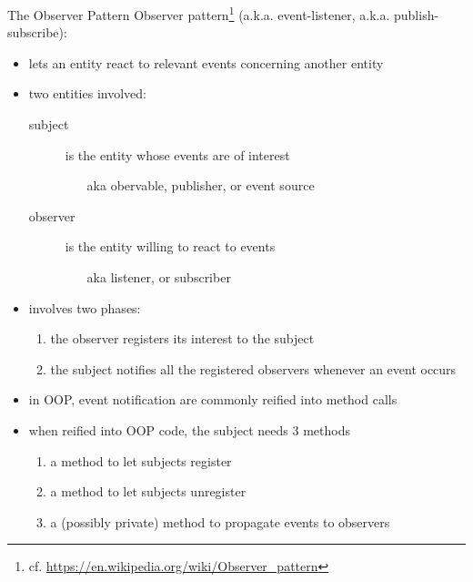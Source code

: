 \documentclass[presentation]{beamer}
\begin{document}
\begin{frame}[allowframebreaks]{The Observer Pattern}
  Observer pattern\footnote{cf. \url{https://en.wikipedia.org/wiki/Observer_pattern}} (a.k.a. event-listener, a.k.a. publish-subscribe):
  \begin{itemize}
    \item lets an entity \alert{react} to relevant events concerning another entity

    \item two entities involved: 
    \begin{description}
      \item[subject] is the entity whose events are of interest
      \begin{itemize}
        \item[aka] obervable,  publisher, or event source
      \end{itemize} 

      \item[observer] is the entity willing to react to events
      \begin{itemize}
        \item[aka] listener, or subscriber
      \end{itemize} 
    \end{description}

    \item involves two phases:
    \begin{enumerate}
      \item the observer registers its interest to the subject
      \item the subject notifies all the registered observers whenever an event occurs
    \end{enumerate}

    \framebreak

    \item in OOP, event notification are commonly reified into method calls

    \item when reified into OOP code, the subject needs 3 methods
    \begin{enumerate}
      \item a method to let subjects register
      \item a method to let subjects unregister
      \item a (possibly private) method to propagate events to observers
    \end{enumerate}


\end{itemize}
\end{frame}
\end{document}
